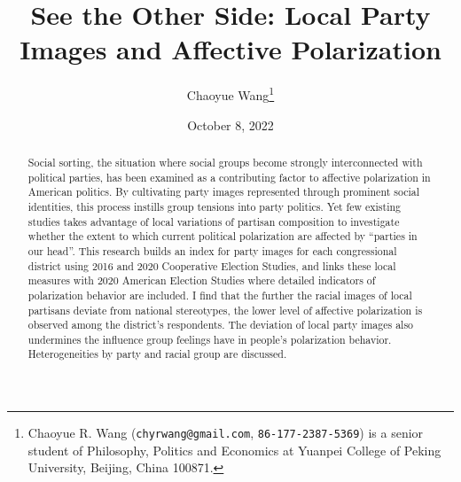 \documentclass[
  12pt,
]{article}
\title{See the Other Side: Local Party Images and Affective
Polarization}
\author{Chaoyue Wang\footnote{Chaoyue R. Wang
  (\texttt{chyrwang@gmail.com}, \texttt{86-177-2387-5369}) is a senior
  student of Philosophy, Politics and Economics at Yuanpei College of
  Peking University, Beijing, China 100871.}}
\date{October 8, 2022}
\begin{document}
\maketitle


\thispagestyle{empty}

\begin{abstract}  \onehalfspacing
\begin{normalsize}  \noindent 
Social sorting, the situation where social groups become strongly
interconnected with political parties, has been examined as a
contributing factor to affective polarization in American politics. By
cultivating party images represented through prominent social
identities, this process instills group tensions into party politics.
Yet few existing studies takes advantage of local variations of partisan
composition to investigate whether the extent to which current political
polarization are affected by ``parties in our head''. This research
builds an index for party images for each congressional district using
2016 and 2020 Cooperative Election Studies, and links these local
measures with 2020 American Election Studies where detailed indicators
of polarization behavior are included. I find that the further the
racial images of local partisans deviate from national stereotypes, the
lower level of affective polarization is observed among the district's
respondents. The deviation of local party images also undermines the
influence group feelings have in people's polarization behavior.
Heterogeneities by party and racial group are discussed.
\end{normalsize}
\end{abstract}

\begin{quote}
\end{quote}

\newpage \clearpage {}\captionsetup{labelfont = bf, font = small}



\ifdefined\Shaded\renewenvironment{Shaded}{\begin{tcolorbox}[frame hidden, enhanced, sharp corners, breakable, interior hidden, borderline west={3pt}{0pt}{shadecolor}, boxrule=0pt]}{\end{tcolorbox}}\fi
\end{document}
